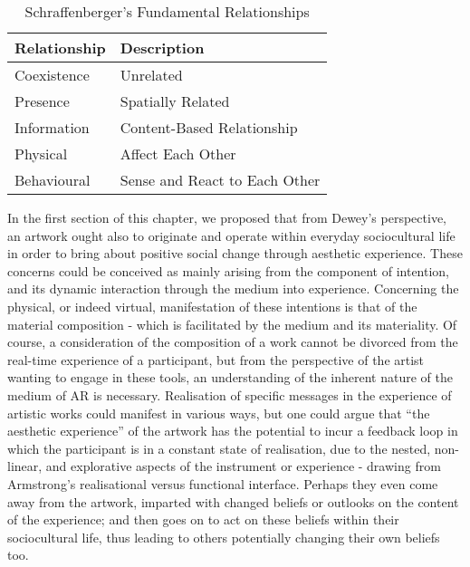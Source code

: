 \begin{table}
    \centering
    \begin{tabular}{ l l }
        \toprule
        Relationship        & Description                       \\
        \midrule
        Coexistence         & Unrelated                         \\
        Presence            & Spatially Related                 \\
        Information         & Content-Based Relationship        \\
        Physical            & Affect Each Other                 \\
        Behavioural         & Sense and React to Each Other     \\
        \bottomrule
    \end{tabular}
    \caption{Schraffenberger's Fundamental Relationships}\label{table:schraffenbergertaxonomy2}
\end{table}
In the first section of this chapter, we proposed that from Dewey’s perspective, an artwork ought also to originate and operate within everyday sociocultural life in order to bring about positive social change through aesthetic experience. These concerns could be conceived as mainly arising from the component of intention, and its dynamic interaction through the medium into experience. Concerning the physical, or indeed virtual, manifestation of these intentions is that of the material composition - which is facilitated by the medium and its materiality. Of course, a consideration of the composition of a work cannot be divorced from the real-time experience of a participant, but from the perspective of the artist wanting to engage in these tools, an understanding of the inherent nature of the medium of AR is necessary.  Realisation of specific messages in the experience of artistic works could manifest in various ways, but one could argue that “the aesthetic experience” of the artwork has the potential to incur a feedback loop in which the participant is in a constant state of realisation, due to the nested, non-linear, and explorative aspects of the instrument or experience - drawing from Armstrong’s realisational versus functional interface. Perhaps they even come away from the artwork, imparted with changed beliefs or outlooks on the content of the experience; and then goes on to act on these beliefs within their sociocultural life, thus leading to others potentially changing their own beliefs too.


